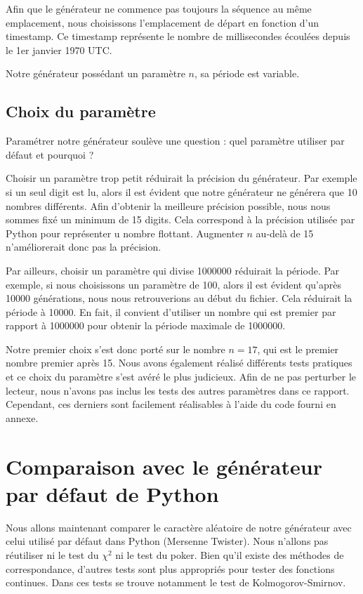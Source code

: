 \documentclass[10pt,a4paper]{article}
\begin{document}
	Afin que le générateur ne commence pas toujours la séquence au même emplacement, nous choisissons l'emplacement de départ en fonction d'un timestamp.
	Ce timestamp représente le nombre de millisecondes écoulées depuis le 1er janvier 1970 UTC.
	
	Notre générateur possédant un paramètre $n$, sa période est variable.
	
	\subsection{Choix du paramètre}
	Paramétrer notre générateur soulève une question : quel paramètre utiliser par défaut et pourquoi ?
	
	Choisir un paramètre trop petit réduirait la précision du générateur.
	Par exemple si un seul digit est lu, alors il est évident que notre générateur ne générera que 10 nombres différents.
	Afin d'obtenir la meilleure précision possible, nous nous sommes fixé un minimum de 15 digits.
	Cela correspond à la précision utilisée par Python pour représenter u nombre flottant.
	Augmenter $n$ au-delà de 15 n'améliorerait donc pas la précision.
	
	Par ailleurs, choisir un paramètre qui divise 1000000 réduirait la période.
	Par exemple, si nous choisissons un paramètre de 100, alors il est évident qu'après 10000 générations, nous nous retrouverions au début du fichier.
	Cela réduirait la période à 10000.
	En fait, il convient d'utiliser un nombre qui est premier par rapport à 1000000 pour obtenir la période maximale de 1000000.
	
	Notre premier choix s'est donc porté sur le nombre $n = 17$, qui est le premier nombre premier après 15.
	Nous avons également réalisé différents tests pratiques et ce choix du paramètre s'est avéré le plus judicieux.
	Afin de ne pas perturber le lecteur, nous n'avons pas inclus les tests des autres paramètres dans ce rapport.
	Cependant, ces derniers sont facilement réalisables à l'aide du code fourni en annexe.
	
	\newpage
	\section{Comparaison avec le générateur par défaut de Python}
	Nous allons maintenant comparer le caractère aléatoire de notre générateur avec celui utilisé par défaut dans Python (Mersenne Twister).
	Nous n'allons pas réutiliser ni le test du $\chi^2$ ni le test du poker.
	Bien qu'il existe des méthodes de correspondance, d'autres tests sont plus appropriés pour tester des fonctions continues.
	Dans ces tests se trouve notamment le test de Kolmogorov-Smirnov.
	
\end{document}
